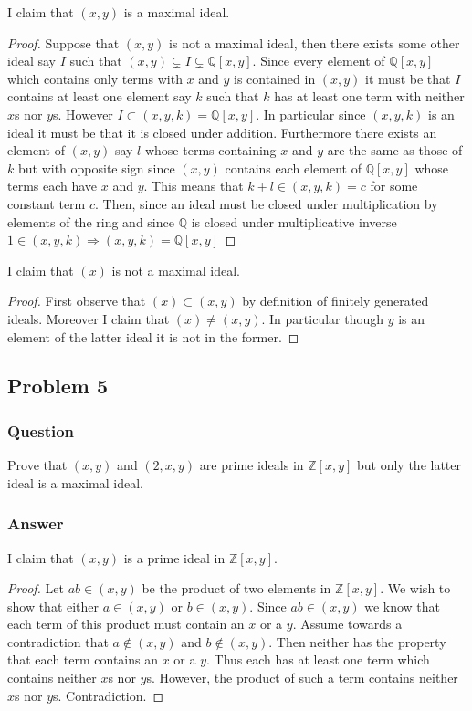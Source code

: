 \documentclass[12pt]{article}
\begin{document}
I claim that $(x,y)$ is a maximal ideal.
\begin{proof}
Suppose that $(x,y)$ is not a maximal ideal, then there exists some other ideal say $I$ such that $(x,y) \subsetneq I \subsetneq \mathbb{Q}[x,y]$. Since every element of $\mathbb{Q}[x,y]$ which contains only terms with $x$ and $y$ is contained in  $(x,y)$ it must be that $I$ contains at least one element say $k$ such that $k$ has at least one term with neither $x$s nor $y$s. However $I \subset (x,y,k)=\mathbb{Q}[x,y] $. In particular since $(x,y,k)$ is an ideal it must be that it is closed under addition. Furthermore there exists an element of $(x,y)$ say $l$ whose terms containing $x$ and $y$ are the same as those of $k$ but with opposite sign since $(x,y)$ contains each element of $\mathbb{Q}[x,y]$ whose terms each have $x$ and $y$. This means that $k+l \in (x,y,k) = c$ for some constant term $c$. Then, since an ideal must be closed under multiplication by elements of the ring and since $\mathbb{Q}$ is closed under multiplicative inverse $1 \in (x,y,k) \Rightarrow (x,y,k)=\mathbb{Q}[x,y]$  
\end{proof}

I claim that $(x)$ is not a maximal ideal.
\begin{proof}
First observe that $(x) \subset (x,y)$ by definition of finitely generated ideals. Moreover I claim that $(x) \neq (x,y)$. In particular though $y$ is an element of the latter ideal it is not in the former.
\end{proof}

\subsection{Problem 5}

\subsubsection{Question}
Prove that $(x,y)$  and $(2,x,y)$ are prime ideals in $\mathbb{Z}[x,y]$ but only the latter ideal is a maximal ideal.
\subsubsection{Answer}

I claim that $(x,y)$ is a prime ideal in $\mathbb{Z}[x,y]$.
\begin{proof}
Let $a b \in (x,y)$ be the product of two elements in $\mathbb{Z}[x,y]$. We wish to show that either $a \in (x,y)$ or $b \in (x,y)$. Since $a b \in (x,y)$ we know that each term of this product must contain an $x$ or a $y$. Assume towards a contradiction that $a \notin (x,y)$ and $b \notin (x,y)$. Then neither has the property that each term contains an $x$ or a $y$. Thus each has at least one term which contains neither $x$s nor $y$s. However, the product of such a term contains neither $x$s nor $y$s. Contradiction.
\end{proof}
\end{document}
